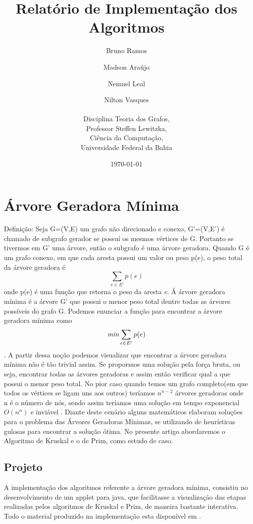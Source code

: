 \documentclass[a4paper,12pt]{article}
\begin{document}
\title{Relatório de Implementação dos Algoritmos}
\author{Bruno Ramos \and Madson Araújo \and Nemuel Leal \and Nilton Vasques\\\\
	Disciplina Teoria dos Grafos,\\
	Professor Steffen Lewitzka,\\
	Ciência da Computação,\\
	Universidade Federal da Bahia}
\date{\today}
\maketitle


\section{Árvore Geradora Mínima}
Definição: Seja G=(V,E) um grafo não direcionado e conexo, G'=(V,E') é chamado de subgrafo gerador se possuí os mesmos vértices de G. Portanto se tivermos em G' uma árvore, então o subgrafo é uma árvore geradora. 
Quando G é um grafo conexo, em que cada aresta possui um valor ou peso p(e), o peso total da árvore geradora é \[\sum_{e \in E'}p(e)\] onde p(e) é uma função que retorna o peso da aresta \emph{e}. Á árvore geradora mínima é a árvore G' que possui o menor peso total dentre todas as árvores possíveis do grafo G\cite{nogueira}. Podemos enunciar a função para encontrar a árvore geradora mínima como \[\emph{min}\sum_{e\in E'}p(e)\].
A partir dessa noção podemos visualizar que encontrar a árvore geradora mínima não é tão trivial assim. Se propormos uma solução pela força bruta, ou seja, encontrar todas as árvores geradoras e assim então verificar qual a que possui o menor peso total. No pior caso quando temos um grafo completo(em que todos os vértices se ligam uns aos outros) teríamos $n^{n-2}$ árvores geradoras onde n é o número de nós, sendo assim teríamos uma solução em tempo exponencial $O(n^n)$ e inviável \nocite{*}.
Diante deste cenário alguns matemáticos elaboram soluções para o problema das Árvores Geradoras Mínimas, se utilizando de heurísticas gulosas para encontrar a solução ótima. No presente artigo abordaremos o Algoritmo de Kruskal e o de Prim, como estudo de caso.

\subsection{Projeto}
A implementação dos algoritmos referente a árvore geradora mínima, consistiu no desenvolvimento de um applet para java, que facilitasse a visualização das etapas realizadas pelos algoritmos de Kruskal e Prim, de maneira bastante interativa. Todo o material produzido na implementação esta disponível em \cite{niltonvasques}.
\end{document}
